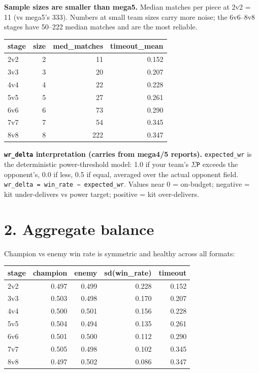 \documentclass[10pt]{article}
\begin{document}
\textbf{Sample sizes are smaller than mega5.} Median matches per piece at 2v2 = 11 (vs mega5's 333). Numbers at small team sizes carry more noise; the 6v6--8v8 stages have 50--222 median matches and are the most reliable.\\

\medskip
\begin{tabularx}{\linewidth}{Lrrr}
\toprule
\textbf{stage} & \textbf{size} & \textbf{med\_matches} & \textbf{timeout\_mean} \\
\midrule
2v2 & 2 & 11 & 0.152 \\
3v3 & 3 & 20 & 0.207 \\
4v4 & 4 & 22 & 0.228 \\
5v5 & 5 & 27 & 0.261 \\
6v6 & 6 & 73 & 0.290 \\
7v7 & 7 & 54 & 0.345 \\
8v8 & 8 & 222 & 0.347 \\
\bottomrule
\end{tabularx}
\medskip

\textbf{\texttt{wr\_\allowbreak{}delta} interpretation (carries from mega4/5 reports).} \texttt{expected\_\allowbreak{}wr} is the deterministic power-threshold model: 1.0 if your team's \texttt{$\Sigma$P} exceeds the opponent's, 0.0 if less, 0.5 if equal, averaged over the actual opponent field. \texttt{wr\_\allowbreak{}delta = win\_\allowbreak{}rate − expected\_\allowbreak{}wr}. Values near 0 = on-budget; negative = kit under-delivers vs power target; positive = kit over-delivers.\\


\section*{2. Aggregate balance}

Champion vs enemy win rate is symmetric and healthy across all formats:\\

\medskip
\begin{tabularx}{\linewidth}{Lrrrr}
\toprule
\textbf{stage} & \textbf{champion} & \textbf{enemy} & \textbf{sd(win\_rate)} & \textbf{timeout} \\
\midrule
2v2 & 0.497 & 0.499 & 0.228 & 0.152 \\
3v3 & 0.503 & 0.498 & 0.170 & 0.207 \\
4v4 & 0.500 & 0.501 & 0.156 & 0.228 \\
5v5 & 0.504 & 0.494 & 0.135 & 0.261 \\
6v6 & 0.501 & 0.500 & 0.112 & 0.290 \\
7v7 & 0.505 & 0.498 & 0.102 & 0.345 \\
8v8 & 0.497 & 0.502 & 0.086 & 0.347 \\
\bottomrule
\end{tabularx}
\medskip
\end{document}
